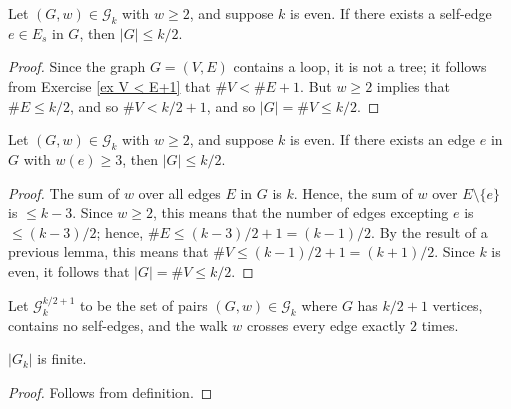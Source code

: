 \begin{proposition}%
  \label{prop:g_bound_self_edge}
  \notready
  Let $(G,w)\in\mathcal{G}_k$ with $w\ge 2$, and suppose $k$ is even. If there exists a self-edge $e\in E_s$ in $G$, then $|G|\le k/2$.
\end{proposition}

\begin{proof}
  \notready
  Since the graph $G = (V,E)$ contains a loop, it is not a tree; it follows from Exercise \ref{ex V < E+1} that $\#V < \#E+1$.  But $w\ge 2$ implies that $\#E\le k/2$, and so $\#V < k/2+1$, and so $|G| = \#V \le k/2$.
\end{proof}

\begin{proposition}%
  \label{prop:g_bound_large_w}
  \notready
  Let $(G,w)\in\mathcal{G}_k$ with $w\ge 2$, and suppose $k$ is even. If there exists an edge $e$ in $G$ with $w(e)\ge 3$, then $|G|\le k/2$.
\end{proposition}

\begin{proof}
  \notready
  The sum of $w$ over all edges $E$ in $G$ is $k$.  Hence, the sum of $w$ over $E\setminus\{e\}$ is $\le k-3$.  Since $w\ge 2$, this means that the number of edges excepting $e$ is $\le (k-3)/2$; hence, $\#E \le (k-3)/2+1 = (k-1)/2$.  By the result of a previous lemma, this means that $\#V \le (k-1)/2+1 = (k+1)/2$.  Since $k$ is even, it follows that $|G|=\#V \le k/2$.
\end{proof}




\begin{definition}
  \label{def:special_set_g}
  \notready
  Let $\mathcal{G}^{k/2+1}_k$ to be the set of pairs $(G,w)\in\mathcal{G}_k$ where $G$ has $k/2+1$ vertices, contains no self-edges, and the walk $w$ crosses every edge exactly $2$ times.
\end{definition}


\begin{lemma}
  \label{lemma:graph_set_finite}
  \notready
  $|G_k|$ is finite.
\end{lemma}

\begin{proof}
  \notready
  Follows from definition.
\end{proof}


